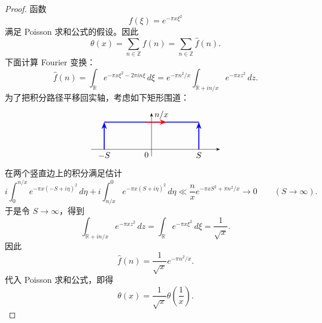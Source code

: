 \begin{proof}
	函数
	\[
		f(\xi)=e^{-\pi x\xi^2}
	\]
	满足 Poisson 求和公式的假设。因此
	\[
		\theta(x)=\sum_{n\in\mathbb Z}f(n)
		=
		\sum_{n\in\mathbb Z}\widehat f(n).
	\]
	下面计算 Fourier 变换：
	\[
		\widehat f(n)
		=
		\int_{\mathbb R}e^{-\pi x\xi^2-2\pi in\xi}\,d\xi
		=
		e^{-\pi n^2/x}
		\int_{\mathbb R+in/x}e^{-\pi x z^2}\,dz.
	\]
	为了把积分路径平移回实轴，考虑如下矩形围道：
	\[
	\begin{tikzpicture}[baseline=(current bounding box.center),scale=0.85,>=Stealth]
		\draw[->] (-3.0,0) -- (3.4,0);
		\draw[->] (0,-0.35) -- (0,1.8);
		\node[below] at (-2.35,0) {$-S$};
		\node[below] at (2.35,0) {$S$};
		\node[below left] at (0,0) {$0$};
		\node[above right] at (0,1.35) {$n/x$};
		\draw[blue,very thick,->] (-2.35,0) -- (-2.35,1.35);
		\draw[blue,very thick,->] (2.35,0) -- (2.35,1.35);
		\draw[blue,very thick] (-2.35,1.35) -- (2.35,1.35);
		\draw[red,very thick,->] (-0.3,1.35) -- (0.75,1.35);
	\end{tikzpicture}
	\]
	在两个竖直边上的积分满足估计
	\[
		i\int_0^{n/x}e^{-\pi x(-S+i\eta)^2}\,d\eta
		+
		i\int_{n/x}^{0}e^{-\pi x(S+i\eta)^2}\,d\eta
		\ll
		\frac{n}{x}e^{-\pi xS^2+\pi n^2/x}
		\longrightarrow0
		\qquad (S\to\infty).
	\]
	于是令 $S\to\infty$，得到
	\[
		\int_{\mathbb R+in/x}e^{-\pi xz^2}\,dz
		=
		\int_{\mathbb R}e^{-\pi x\xi^2}\,d\xi
		=
		\frac{1}{\sqrt{x}}.
	\]
	因此
	\[
		\widehat f(n)=\frac{1}{\sqrt{x}}e^{-\pi n^2/x}.
	\]
	代入 Poisson 求和公式，即得
	\[
		\theta(x)=\frac{1}{\sqrt{x}}\theta\left(\frac1x\right).
	\]
\end{proof}


